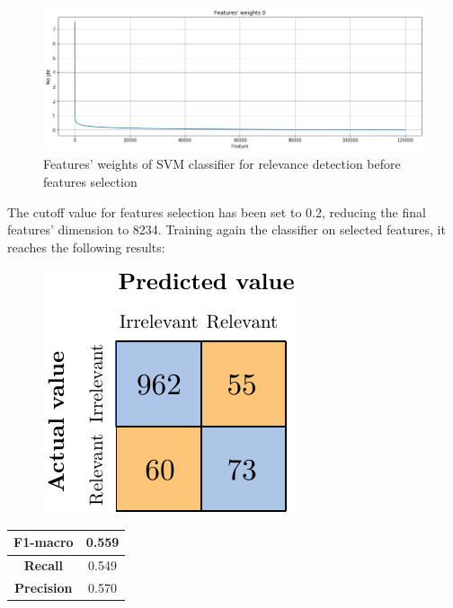 \begin{figure}[H]
	\centering
	\includegraphics[width=\textwidth]{figures/conf_matrices/ita_rel_svm/ita_rel_svm_fs.png}
	\caption{Features' weights of SVM classifier for relevance detection before features selection}
	\label{fig:ita_rel_svm_fs}
\end{figure}

The cutoff value for features selection has been set to 0.2, reducing the final features' dimension to 8234. Training again the classifier on selected features, it reaches the following results:


\begin{figure}[H]
	\centering
	\includegraphics[scale=1]{figures/conf_matrices/ita_rel_svm/ita_rel_svm_afs.pdf}
	\label{fig:ita_rel_svm_afs}
\end{figure}

\begin{center}
	\begin{tabular}{ | c | c | } 
		\hline
		\textbf{F1-macro} & 0.559 \\
		\hline
		\textbf{Recall} & 0.549 \\ 
		\hline
		\textbf{Precision} & 0.570 \\ 
		\hline
	\end{tabular}
\end{center}

